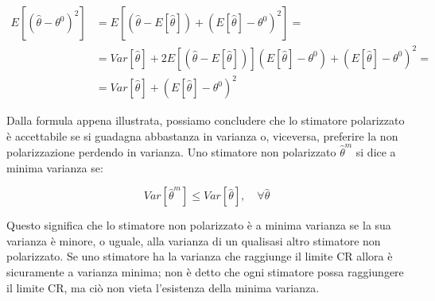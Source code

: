     \[
        \begin{split}
            E[(\hat{\theta}-\theta^0)^2]&=E[(\hat{\theta}-E[\hat{\theta}])+(E[\hat{\theta}]-\theta^0)^2]=\\
            &=Var[\hat{\theta}]+2E[(\hat{\theta}-E[\hat{\theta}])](E[\hat{\theta}]-\theta^0)+(E[\hat{\theta}]-\theta^0)^2=\\
            &=Var[\hat{\theta}]+(E[\hat{\theta}]-\theta^0)^2
        \end{split}
    \]
    
Dalla formula appena illustrata, possiamo concludere che lo stimatore polarizzato è accettabile se si guadagna abbastanza in varianza o, viceversa, preferire la non polarizzazione perdendo in varianza. Uno stimatore non polarizzato $\hat{\theta}^m$ si dice a minima varianza  se:

    \[ Var[\hat{\theta}^m]\leq Var[\hat{\theta}],\quad\forall \hat{\theta} \]

Questo significa che lo stimatore non polarizzato è a minima varianza se la sua varianza è minore, o uguale, alla varianza di un qualisasi altro stimatore non polarizzato. Se uno stimatore ha la varianza che raggiunge il limite CR  allora è sicuramente a varianza minima; non è detto che ogni stimatore possa raggiungere il limite CR, ma ciò non vieta l'esistenza della minima varianza.
